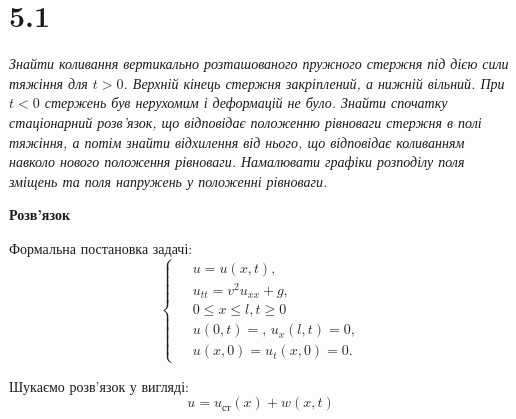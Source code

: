 


%


\section[Задача №5.1]{5.1}

\textit{Знайти коливання вертикально розташованого пружного стержня під дією сили тяжіння для $t > 0$. Верхній кінець стержня закріплений, а нижній вільний. При $t < 0$ стержень був нерухомим і деформацій не було. Знайти спочатку стаціонарний розв’язок, що відповідає положенню рівноваги стержня в полі тяжіння, а потім знайти відхилення від нього, що відповідає коливанням навколо нового положення рівноваги. Намалювати графіки розподілу поля зміщень та поля напружень у положенні рівноваги.}

\begin{center}
    \large{\textbf{Розв'язок}}
\end{center}

\noindent Формальна постановка задачі:
\begin{equation} %
    \left\{ \begin{aligned}
            \;&u = u(x,t), \\
            &u_{tt} = v^2 u_{xx} + g, \\
            &0 \leq x \leq l, t \geq 0 \\
            &u(0,t) = , \, u_x(l,t) = 0, \\
            &u(x,0) = u_t(x,0) = 0.
    \end{aligned} \right.
\end{equation}

Шукаємо розв'язок у вигляді:
\begin{equation}
    u = u_{\text{ст}}(x) + w(x,t)
\end{equation}

